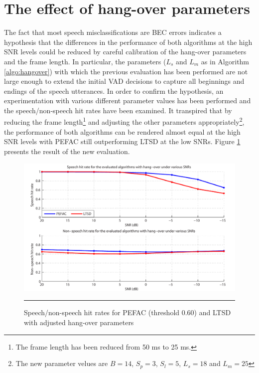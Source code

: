\section{The effect of hang-over parameters}

The fact that most speech misclassifications are BEC errors indicates a hypothesis that the differences in the performance of both algorithms at the high SNR levels could be reduced by careful calibration of the hang-over parameters and the frame length. In particular, the parameters ($L_s$ and $L_m$ as in Algorithm \ref{algo:hangover}) with which the previous evaluation has been performed are not large enough to extend the initial VAD decisions to capture all beginnings and endings of the speech utterances. In order to confirm the hypothesis, an experimentation with various different parameter values has been performed and the speech/non-speech hit rates have been examined. It transpired that by reducing the frame length\footnote{The frame length has been reduced from 50 ms to 25 ms.} and adjusting the other parameters appropriately\footnote{The new parameter velues are $B=14$, $S_p=3$, $S_l=5$, $L_s=18$ and $L_m=25$}, the performance of both algorithms can be rendered almost equal at the high SNR levels with PEFAC still outperforming LTSD at the low SNRs. Figure \ref{fig:diffhangpars} presents the result of the new evaluation.

\begin{figure}[htbp]
	\centering
		\includegraphics[width=0.9\columnwidth]{Figures/Chapter5/diffhangpars.pdf}
		\rule{37em}{0.5pt}
	\caption[Speech/non-speech hit rates for PEFAC (threshold 0.60) and LTSD with adjusted hang-over parameters]{Speech/non-speech hit rates for PEFAC (threshold 0.60) and LTSD with adjusted hang-over parameters}
	\label{fig:diffhangpars}
\end{figure}

